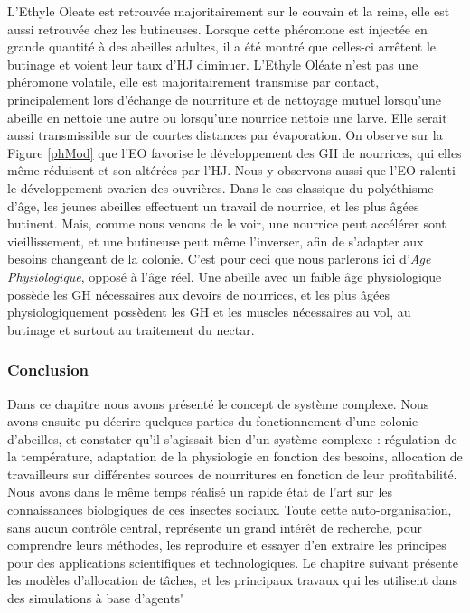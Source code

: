 			 L'Ethyle Oleate est retrouvée majoritairement sur le couvain et la reine, elle est aussi retrouvée chez les butineuses. Lorsque cette phéromone est injectée en grande quantité à des abeilles adultes, il a été montré que celles-ci arrêtent le butinage et voient leur taux d'HJ diminuer. L'Ethyle Oléate n'est pas une phéromone volatile, elle est majoritairement transmise par contact, principalement lors d'échange de nourriture et de nettoyage mutuel lorsqu'une abeille en nettoie une autre ou lorsqu'une nourrice nettoie une larve. Elle serait aussi transmissible sur de courtes distances par évaporation. On observe sur la Figure \ref{phMod} que l'EO favorise le développement des GH de nourrices, qui elles même réduisent et son altérées par l'HJ. Nous y observons aussi que l'EO ralenti le développement ovarien des ouvrières. Dans le cas classique du polyéthisme d'âge, les jeunes abeilles effectuent un travail de nourrice, et les plus âgées butinent. Mais, comme nous venons de le voir, une nourrice peut accélérer sont vieillissement, et une butineuse peut même l'inverser, afin de s'adapter aux besoins changeant de la colonie. C'est pour ceci que nous parlerons ici d'\textit{Age Physiologique}, opposé à l'âge réel. Une abeille avec un faible âge physiologique possède les GH nécessaires aux devoirs de nourrices, et les plus âgées physiologiquement possèdent les GH et les muscles nécessaires au vol, au butinage et surtout au traitement du nectar.
			
		\subsubsection{Conclusion}
			
		Dans ce chapitre nous avons présenté le concept de système complexe. Nous avons ensuite pu décrire quelques parties du fonctionnement d'une colonie d'abeilles, et constater qu'il s'agissait bien d'un système complexe : régulation de la température, adaptation de la physiologie en fonction des besoins, allocation de travailleurs sur différentes sources de nourritures en fonction de leur profitabilité. Nous avons dans le même temps réalisé un rapide état de l'art sur les connaissances biologiques de ces insectes sociaux. Toute cette auto-organisation, sans aucun contrôle central, représente un grand intérêt de recherche, pour comprendre leurs méthodes, les reproduire et essayer d'en extraire les principes pour des applications scientifiques et technologiques. Le chapitre suivant présente les modèles d'allocation de tâches, et les principaux travaux qui les utilisent dans des simulations à base d'agents"